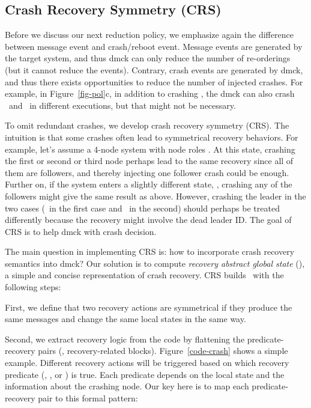 


\subsection{Crash Recovery Symmetry (CRS)}
\label{sam-crs}


Before we discuss our next reduction policy, we emphasize again the
difference between message event and crash/reboot event.  Message
events are generated by the target system, and thus dmck can only
reduce the number of re-orderings (but it cannot reduce the events).
Contrary, crash events are generated by dmck, and thus there exists
opportunities to reduce the number of injected crashes.  For example,
in Figure~\ref{fig-pol}c, in addition to crashing \ftri, the dmck can
also crash \fone\ and \ftwo\ in different executions, but that might
not be necessary.



To omit redundant crashes, we develop crash recovery symmetry (CRS).
The intuition is that some crashes often lead to symmetrical recovery
behaviors.  For example, let's assume a 4-node system with node
roles .  At this state, crashing the first or second or third
node perhaps lead to the same recovery since all of them are
followers, and thereby injecting one follower crash could be enough.
Further on, if the system enters a slightly different
state, , crashing any of the followers might give the same
result as above.  However, crashing the leader in the two cases
(\nfour\ in the first case and \ntri\ in the second) should perhaps be
treated differently because the recovery might involve the dead leader
ID.  The goal of CRS is to help dmck with crash decision.


The main question in implementing CRS is: how to incorporate crash
recovery semantics into dmck?  Our solution is to compute {\em recovery
abstract global state} (\rags), a simple and concise representation of
crash recovery.  CRS builds \rags\ with the following steps:

First, we define that two recovery actions are symmetrical if they
produce the same messages and change the same local states in the same
way.

Second, we extract recovery logic from the code by flattening the
predicate-recovery pairs (\ie, recovery-related  blocks).
Figure~\ref{code-crash} shows a simple example.  Different recovery
actions will be triggered based on which recovery predicate
(\prone, \prtwo, or \prtri) is true.  Each predicate depends on the
local state and the information about the crashing node.  Our key here
is to map each predicate-recovery pair to this formal pattern:


